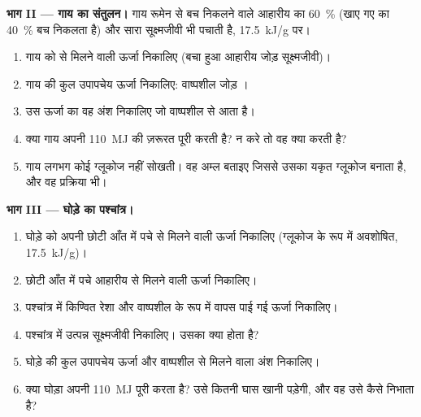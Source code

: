 \begin{problem}
\medskip
\noindent\textbf{भाग II --- गाय का संतुलन।}
गाय रूमेन से बच निकलने वाले आहारीय  का \qty{60}{\%} (खाए गए
 का \qty{40}{\%} बच निकलता है) और सारा सूक्ष्मजीवी  भी
पचाती है, \qty{17.5}{kJ/g} पर।
\begin{enumerate}[resume]
  \item गाय को  से मिलने वाली ऊर्जा निकालिए (बचा हुआ आहारीय
        जोड़ सूक्ष्मजीवी)।
  \item गाय की कुल उपापचेय ऊर्जा निकालिए: वाष्पशील  जोड़
        ।
  \item उस ऊर्जा का वह अंश निकालिए जो वाष्पशील  से आता
        है।
  \item क्या गाय अपनी \qty{110}{MJ} की ज़रूरत पूरी करती है? न करे तो
        वह क्या करती है?
  \item गाय लगभग कोई ग्लूकोज नहीं सोखती। वह अम्ल बताइए जिससे उसका यकृत
        ग्लूकोज बनाता है, और वह प्रक्रिया भी।
\end{enumerate}

\medskip
\noindent\textbf{भाग III --- घोड़े का पश्चांत्र।}
\begin{enumerate}[resume]
  \item घोड़े को अपनी छोटी आँत में पचे  से मिलने वाली ऊर्जा निकालिए
        (ग्लूकोज के रूप में अवशोषित, \qty{17.5}{kJ/g})।
  \item छोटी आँत में पचे आहारीय  से मिलने वाली ऊर्जा
        निकालिए।
  \item पश्चांत्र में किण्वित रेशा और वाष्पशील  के रूप में
        वापस पाई गई ऊर्जा निकालिए।
  \item पश्चांत्र में उत्पन्न सूक्ष्मजीवी  निकालिए। उसका क्या
        होता है?
  \item घोड़े की कुल उपापचेय ऊर्जा और वाष्पशील  से मिलने
        वाला अंश निकालिए।
  \item क्या घोड़ा अपनी \qty{110}{MJ} पूरी करता है? उसे कितनी घास खानी
        पड़ेगी, और वह उसे कैसे निभाता है?
\end{enumerate}


\end{problem}
